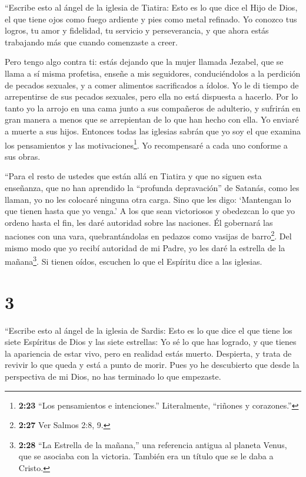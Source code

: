  ``Escribe esto al ángel de la iglesia de Tiatira: Esto es
lo que dice el Hijo de Dios, el que tiene ojos como fuego ardiente y
pies como metal refinado.  Yo conozco tus logros, tu amor y
fidelidad, tu servicio y perseverancia, y que ahora estás trabajando más
que cuando comenzaste a creer.

 Pero tengo algo contra ti: estás dejando que la mujer
llamada Jezabel, que se llama a sí misma profetisa, enseñe a mis
seguidores, conduciéndolos a la perdición de pecados sexuales, y a comer
alimentos sacrificados a ídolos.  Yo le di tiempo de
arrepentirse de sus pecados sexuales, pero ella no está dispuesta a
hacerlo.  Por lo tanto yo la arrojo en una cama junto a sus
compañeros de adulterio, y sufrirán en gran manera a menos que se
arrepientan de lo que han hecho con ella.  Yo enviaré a
muerte a sus hijos. Entonces todas las iglesias sabrán que yo soy el que
examina los pensamientos y las motivaciones\footnote{\textbf{2:23} ``Los
  pensamientos e intenciones.'' Literalmente, ``riñones y corazones.''}.
Yo recompensaré a cada uno conforme a sus obras.

 ``Para el resto de ustedes que están allá en Tiatira y que
no siguen esta enseñanza, que no han aprendido la ``profunda
depravación'' de Satanás, como les llaman, yo no les colocaré ninguna
otra carga. Sino que les digo:  `Mantengan lo que tienen
hasta que yo venga.'  A los que sean victoriosos y
obedezcan lo que yo ordeno hasta el fin, les daré autoridad sobre las
naciones.  Él gobernará las naciones con una vara,
quebrantándolas en pedazos como vasijas de barro\footnote{\textbf{2:27}
  Ver Salmos 2:8, 9.}. Del mismo modo que yo recibí autoridad de mi
Padre,  yo les daré la estrella de la mañana\footnote{\textbf{2:28}
  ``La Estrella de la mañana,'' una referencia antigua al planeta Venus,
  que se asociaba con la victoria. También era un título que se le daba
  a Cristo.}.  Si tienen oídos, escuchen lo que el Espíritu
dice a las iglesias.

\hypertarget{section-2}{%
\section{3}\label{section-2}}

 ``Escribe esto al ángel de la iglesia de Sardis: Esto es lo
que dice el que tiene los siete Espíritus de Dios y las siete estrellas:
Yo sé lo que has logrado, y que tienes la apariencia de estar vivo, pero
en realidad estás muerto.  Despierta, y trata de revivir lo
que queda y está a punto de morir. Pues yo he descubierto que desde la
perspectiva de mi Dios, no has terminado lo que empezaste.

